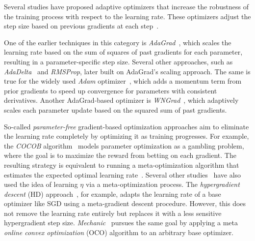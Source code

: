 \documentclass{article} %
\begin{document}
Several studies have proposed adaptive optimizers that increase the robustness of the training process with respect to the learning rate.
These optimizers adjust the step size based on previous gradients at each step~\citep{duchiAdaptiveSubgradientMethods2011}.

One of the earlier techniques in this category is \textit{AdaGrad}~\citep{duchiAdaptiveSubgradientMethods2011}, which scales the learning rate based on the sum of squares of past gradients for each parameter, resulting in a parameter-specific step size.
Several other approaches, such as \textit{AdaDelta}~\citep{zeilerADADELTAAdaptiveLearning2012a} and \textit{RMSProp}, later built on AdaGrad's scaling approach.
The same is true for the widely used \textit{Adam} optimizer~\citep{kingmaAdamMethodStochastic2017b}, which adds a momentum term from prior gradients to speed up convergence for parameters with consistent derivatives.
Another AdaGrad-based optimizer is \textit{WNGrad}~\citep{wuWNGradLearnLearning2020}, which adaptively scales each parameter update based on the squared sum of past gradients.

So-called \textit{parameter-free} gradient-based optimization approaches aim to eliminate the learning rate completely by optimizing it as training progresses.
For example, the \textit{COCOB} algorithm~\citep{orabonaTrainingDeepNetworks2017} models parameter optimization as a gambling problem, where the goal is to maximize the reward from betting on each gradient.
The resulting strategy is equivalent to running a meta-optimization algorithm that estimates the expected optimal learning rate~\citep{orabonaTrainingDeepNetworks2017}.
Several other studies~\citep{schraudolphLocalGainAdaptation1999,vanervenMetaGradMultipleLearning2016a,baydinOnlineLearningRate2018,cutkoskyMechanicLearningRate2023} have also used the idea of learning $\eta$ via a meta-optimization process.
The \textit{hypergradient descent} (HD) approach~\citep{baydinOnlineLearningRate2018}, for example, adapts the learning rate of a base optimizer like SGD using a meta-gradient descent procedure.
However, this does not remove the learning rate entirely but replaces it with a less sensitive hypergradient step size.
\textit{Mechanic}~\citep{cutkoskyMechanicLearningRate2023} pursues the same goal by applying a meta \textit{online convex optimization} (OCO) algorithm to an arbitrary base optimizer.
\end{document}
